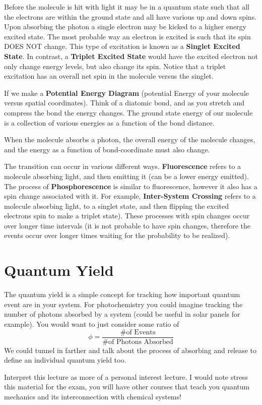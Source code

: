 \documentclass{article}
\newcommand{\be}{\begin{equation}}
\newcommand{\ee}{\end{equation}}
\begin{document}
 Before the molecule is hit with light it may be in a quantum state such that all the electrons are within the ground state and all have various up and down spins.
 Upon absorbing the photon a single electron may be kicked to a higher energy excited state. 
 The most probable way an electron is excited is such that its spin DOES NOT change. 
 This type of excitation is known as a \textbf{Singlet Excited State}.
 In contrast, a \textbf{Triplet Excited State} would have the  excited electron not only change energy levels, but also change its spin. 
 Notice that a triplet excitation has an overall net spin in the molecule versus the singlet. 
 
 If we make a \textbf{Potential Energy Diagram} (potential Energy of your molecule versus spatial coordinates). 
 Think of a diatomic bond, and as you stretch and compress the bond the energy changes. 
 The ground state energy of our molecule is a collection of various energies as a function of the bond distance. 
 
 When the molecule absorbs a photon, the overall energy of the molecule changes, and the energy as a function of bond-coordinate must also change. 
 
 The transition can occur in various different ways. 
 \textbf{Fluorescence} refers to a molecule absorbing light, and then emitting it (can be a lower energy emitted).
 The process of \textbf{Phosphorescence} is similar to fluorescence, however it  also has a spin change associated with it. 
 For example, \textbf{Inter-System Crossing} refers to a molecule absorbing light, to a singlet state, and then flipping the excited electrons spin to make a triplet state). 
 These processes with spin changes occur over longer time intervals (it is not probable to have spin changes, therefore the events occur over longer times waiting for the probability to be realized). 
 
 \section*{Quantum Yield}
 The quantum yield is a simple concept for tracking how important quantum event are in  your system.
 For photochemistry you could imagine tracking the number of photons absorbed by a system (could be useful in solar  panels for example). 
 You would want to just consider  some ratio of 
 \be
 \phi = \frac{\text{\# of Events}}{\text{\# of Photons Absorbed}}
 \ee
 We could tunnel in farther and talk about the process of absorbing and release to define an individual quantum yield too. 
 
 Interpret this lecture as more of a personal interest lecture. 
 I would note stress this material for the exam, you will have other courses that teach you quantum mechanics and its interconnection with chemical systems!
 
\end{document}
